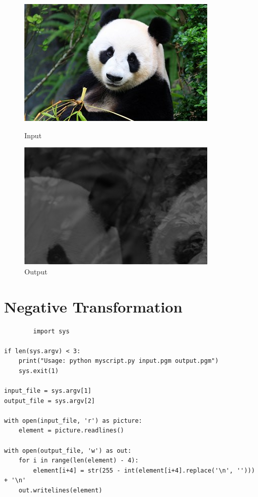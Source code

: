 \documentclass[a4paper,8pt]{article}
\begin{document}
        \begin{figure}[H]
        \centering
        \begin{minipage}{0.4\linewidth}
        \centering
        \includegraphics[width=\linewidth]{output/input1.jpg}
        \caption{Input}
        \end{minipage}
        \hfill
        \begin{minipage}{0.4\linewidth}
        \centering
        \includegraphics[width=\linewidth]{output/Constrst Streaching_output.png}
        \caption{Output}
        \end{minipage}
        \end{figure}
        \clearpage
        
        \section{Negative Transformation}
        \begin{verbatim}
        import sys

if len(sys.argv) < 3:
    print("Usage: python myscript.py input.pgm output.pgm")
    sys.exit(1)

input_file = sys.argv[1]
output_file = sys.argv[2]

with open(input_file, 'r') as picture:
    element = picture.readlines()

with open(output_file, 'w') as out:
    for i in range(len(element) - 4):
        element[i+4] = str(255 - int(element[i+4].replace('\n', ''))) + '\n'
    out.writelines(element)


        \end{verbatim}
        
\end{document}
